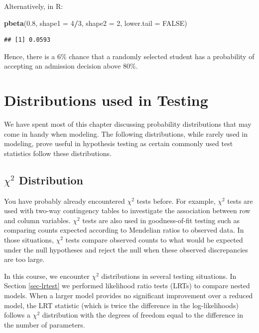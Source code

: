 \documentclass[
]{krantz}
\newenvironment{Shaded}{\begin{snugshade}}{\end{snugshade}}
\newcommand{\DataTypeTok}[1]{\textcolor[rgb]{0.27,0.27,0.27}{#1}}
\newcommand{\DecValTok}[1]{\textcolor[rgb]{0.06,0.06,0.06}{#1}}
\newcommand{\FloatTok}[1]{\textcolor[rgb]{0.06,0.06,0.06}{#1}}
\newcommand{\KeywordTok}[1]{\textcolor[rgb]{0.27,0.27,0.27}{\textbf{#1}}}
\newcommand{\NormalTok}[1]{#1}
\newcommand{\OperatorTok}[1]{\textcolor[rgb]{0.43,0.43,0.43}{\textbf{#1}}}
\newcommand{\OtherTok}[1]{\textcolor[rgb]{0.37,0.37,0.37}{#1}}
\begin{document}
Alternatively, in R:

\begin{Shaded}
\begin{Highlighting}[]
\KeywordTok{pbeta}\NormalTok{(}\FloatTok{0.8}\NormalTok{, }\DataTypeTok{shape1 =} \DecValTok{4}\OperatorTok{/}\DecValTok{3}\NormalTok{, }\DataTypeTok{shape2 =} \DecValTok{2}\NormalTok{, }\DataTypeTok{lower.tail =} \OtherTok{FALSE}\NormalTok{)}
\end{Highlighting}
\end{Shaded}

\begin{verbatim}
## [1] 0.0593
\end{verbatim}

Hence, there is a 6\% chance that a randomly selected student has a probability of accepting an admission decision above 80\%.

\hypertarget{distributions-used-in-testing}{%
\section{Distributions used in Testing}\label{distributions-used-in-testing}}

We have spent most of this chapter discussing probability distributions that may come in handy when modeling. The following distributions, while rarely used in modeling, prove useful in hypothesis testing as certain commonly used test statistics follow these distributions.

\hypertarget{chi2-distribution}{%
\subsection{\texorpdfstring{\(\chi^2\) Distribution}{\textbackslash chi\^{}2 Distribution}}\label{chi2-distribution}}

You have probably already encountered \(\chi^2\) tests before. For example, \(\chi^2\) tests are used with two-way contingency tables to investigate the association between row and column variables. \(\chi^2\) tests are also used in goodness-of-fit testing such as comparing counts expected according to Mendelian ratios to observed data. In those situations, \(\chi^2\) tests compare observed counts to what would be expected under the null hypotheses and reject the null when these observed discrepancies are too large.

In this course, we encounter \(\chi^2\) distributions  in several testing situations. In Section \ref{sec-lrtest} we performed likelihood ratio tests (LRTs) to compare nested models. When a larger model provides no significant improvement over a reduced model, the LRT statistic (which is twice the difference in the log-likelihoods) follows a \(\chi^2\) distribution with the degrees of freedom equal to the difference in the number of parameters.
\end{document}
